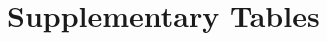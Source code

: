 \documentclass{article}
\begin{document}
\fi
\clearpage
\section*{Supplementary Tables}
\begingroup
\small
\setlength{\LTcapwidth}{\textwidth}
\end{document}
